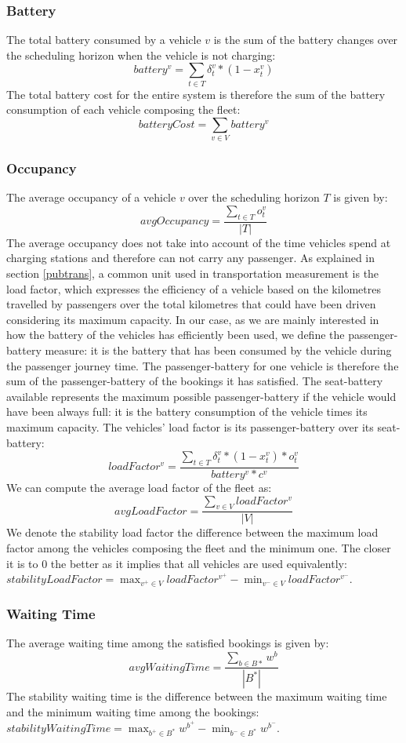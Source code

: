 \documentclass[12pt,a4paper]{article}
\begin{document}
\subsubsection*{Battery}
The total battery consumed by a vehicle $v$ is the sum of the battery changes over the scheduling horizon when the vehicle is not charging:
$$battery^{v} = \sum_{t \in T}\delta^{v}_{t} * (1-x^{v}_{t}) $$
The total battery cost for the entire system is therefore the sum of the battery consumption of each vehicle composing the fleet:
$$batteryCost = \sum_{v \in V}battery^{v}$$
\subsubsection*{Occupancy}
The average occupancy of a vehicle $v$ over the scheduling horizon $T$ is given by:
$$avgOccupancy = \frac{\sum_{t \in T}o^{v}_{t}}{|T|}$$
The average occupancy does not take into account of the time vehicles spend at charging stations and therefore can not carry any passenger. As explained in section \ref{pubtrans}, a common unit used in transportation  measurement is the load factor, which expresses the efficiency of a vehicle based on the kilometres travelled by passengers over the total kilometres that could have been driven considering its maximum capacity. In our case, as we are mainly interested in how the battery of the vehicles has efficiently been used, we define the passenger-battery measure: it is the battery that has been consumed by the vehicle during the passenger journey time. The passenger-battery for one vehicle is therefore the sum of the passenger-battery of the bookings it has satisfied. The seat-battery available represents the maximum possible passenger-battery if the vehicle would have been always full: it is the battery consumption of the vehicle times its maximum capacity. The vehicles' load factor is its passenger-battery over its seat-battery:
$$loadFactor^{v} = \frac{\sum_{t \in T} \delta^{v}_{t} * (1-x^{v}_{t}) * o^{v}_{t}}{battery^{v} * c^{v}}$$
We can compute the average load factor of the fleet as:
$$avgLoadFactor = \frac{\sum_{v \in V}loadFactor^{v}}{|V|}$$
We denote the stability load factor the difference between the maximum load factor among the vehicles composing the fleet and the minimum one. The closer it is to 0 the better as it implies that all vehicles are used equivalently: $stabilityLoadFactor = \max_{v^{+} \in V}{loadFactor^{v^{+}}} -  \min_{v^{-} \in V}{loadFactor^{v^{-}}}$.
\subsubsection*{Waiting Time}
The average waiting time among the satisfied bookings is given by: 
$$avgWaitingTime = \frac{\sum_{b \in B{*}}w^{b}}{|B^{*}|} $$
The stability waiting time is the difference between the maximum waiting time and the minimum waiting time among the bookings:  $stabilityWaitingTime = \max_{b^{+} \in B^{*}}{w^{b^{+}}} -  \min_{b^{-} \in B^{*}}{w^{b^{-}}}$.
\end{document}
